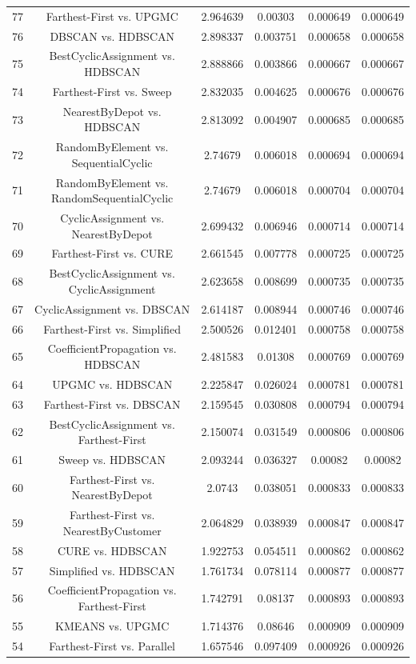 \documentclass[a4paper,10pt]{article}
\begin{document}
\begin{landscape}
\begin{table}[!htp]
\begin{tabular}{cccccc}
77&Farthest-First vs. UPGMC&2.964639&0.00303&0.000649&0.000649\\
76&DBSCAN vs. HDBSCAN&2.898337&0.003751&0.000658&0.000658\\
75&BestCyclicAssignment vs. HDBSCAN&2.888866&0.003866&0.000667&0.000667\\
74&Farthest-First vs. Sweep&2.832035&0.004625&0.000676&0.000676\\
73&NearestByDepot vs. HDBSCAN&2.813092&0.004907&0.000685&0.000685\\
72&RandomByElement vs. SequentialCyclic&2.74679&0.006018&0.000694&0.000694\\
71&RandomByElement vs. RandomSequentialCyclic&2.74679&0.006018&0.000704&0.000704\\
70&CyclicAssignment vs. NearestByDepot&2.699432&0.006946&0.000714&0.000714\\
69&Farthest-First vs. CURE&2.661545&0.007778&0.000725&0.000725\\
68&BestCyclicAssignment vs. CyclicAssignment&2.623658&0.008699&0.000735&0.000735\\
67&CyclicAssignment vs. DBSCAN&2.614187&0.008944&0.000746&0.000746\\
66&Farthest-First vs. Simplified&2.500526&0.012401&0.000758&0.000758\\
65&CoefficientPropagation vs. HDBSCAN&2.481583&0.01308&0.000769&0.000769\\
64&UPGMC vs. HDBSCAN&2.225847&0.026024&0.000781&0.000781\\
63&Farthest-First vs. DBSCAN&2.159545&0.030808&0.000794&0.000794\\
62&BestCyclicAssignment vs. Farthest-First&2.150074&0.031549&0.000806&0.000806\\
61&Sweep vs. HDBSCAN&2.093244&0.036327&0.00082&0.00082\\
60&Farthest-First vs. NearestByDepot&2.0743&0.038051&0.000833&0.000833\\
59&Farthest-First vs. NearestByCustomer&2.064829&0.038939&0.000847&0.000847\\
58&CURE vs. HDBSCAN&1.922753&0.054511&0.000862&0.000862\\
57&Simplified vs. HDBSCAN&1.761734&0.078114&0.000877&0.000877\\
56&CoefficientPropagation vs. Farthest-First&1.742791&0.08137&0.000893&0.000893\\
55&KMEANS vs. UPGMC&1.714376&0.08646&0.000909&0.000909\\
54&Farthest-First vs. Parallel&1.657546&0.097409&0.000926&0.000926\\

\end{tabular}
\end{table}
\end{landscape}
\end{document}
